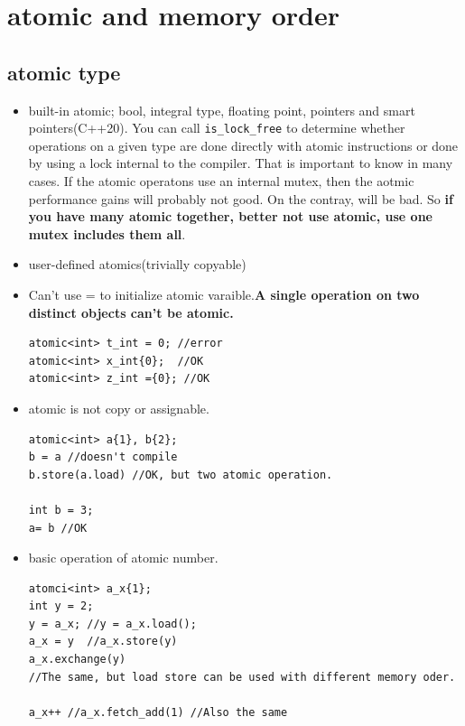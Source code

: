 \documentclass[a4paper,11pt,twoside]{book}
\begin{document}
\section{atomic and memory order}
\subsection{atomic type}
\begin{itemize}

	\item built-in atomic; bool, integral type, floating point, pointers and smart pointers(C++20).  You can call \texttt{is\_lock\_free} to determine whether operations on a given type are done directly with atomic instructions or done by using a lock internal to the compiler. That is important to know in many cases. If the atomic operatons use an internal mutex, then the aotmic performance gains will probably not good. On the contray, will be bad. So \textbf{if you have many atomic together, better not use atomic, use one mutex includes them all}.
	
	\item user-defined atomics(trivially copyable)

	\item Can't use = to initialize atomic varaible.\textbf{A single operation on two distinct objects can't be atomic.}

\begin{lstlisting}[numbers=none]
atomic<int> t_int = 0; //error
atomic<int> x_int{0};  //OK
atomic<int> z_int ={0}; //OK
\end{lstlisting}	

	\item atomic is not copy or assignable.
\begin{lstlisting}[numbers=none]
atomic<int> a{1}, b{2};
b = a //doesn't compile
b.store(a.load) //OK, but two atomic operation.

int b = 3;
a= b //OK	
\end{lstlisting}	

	\item basic operation of atomic number. 
\begin{lstlisting}[numbers=none]
atomci<int> a_x{1};
int y = 2;
y = a_x; //y = a_x.load();
a_x = y  //a_x.store(y) 
a_x.exchange(y) 
//The same, but load store can be used with different memory oder.

a_x++ //a_x.fetch_add(1) //Also the same
\end{lstlisting}	


\end{itemize}
\end{document}
